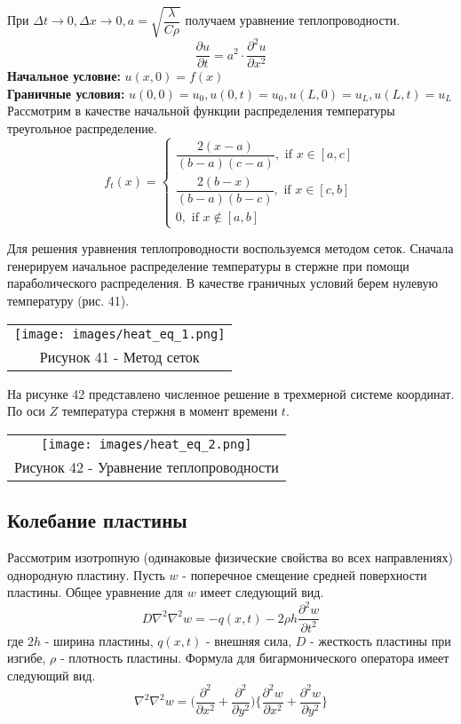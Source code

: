 При $ \Delta t\to 0, \Delta x\to 0,a=\sqrt{\dfrac{\lambda}{C\rho}}$ получаем уравнение теплопроводности.
\begin{equation}
  \dfrac{\partial u}{\partial t}=a^2\cdot\dfrac{\partial^2 u}{\partial x^2}
\end{equation}
\textbf{Начальное условие:} $u(x,0)=f(x)$\\
\textbf{Граничные условия:} $u(0,0)=u_0,u(0,t)=u_0,u(L,0)=u_L,u(L,t)=u_L$
Рассмотрим в качестве начальной функции распределения температуры треугольное распределение.
\begin{equation}
  f_t(x)=\begin{cases}
    \dfrac{2(x-a)}{(b-a)(c-a)}, \text{ if } x\in[a,c]\\
    \dfrac{2(b-x)}{(b-a)(b-c)}, \text{ if } x\in[c,b]\\
    0, \text{ if } x\notin[a,b]
  \end{cases}
\end{equation}

Для решения уравнения теплопроводности воспользуемся методом сеток. Сначала генерируем начальное распределение температуры в стержне при помощи параболического распределения. В качестве граничных условий берем нулевую температуру (рис. 41).
\begin{center}
  \begin{tabular}{c}
  \texttt{[image: images/heat\_eq\_1.png]}\\
  Рисунок 41 - Метод сеток
\end{tabular}
\end{center}

На рисунке 42 представлено численное решение в трехмерной системе координат. По оси $Z$ температура стержня в момент времени $t$.
\begin{center}
  \begin{tabular}{c}
  \texttt{[image: images/heat\_eq\_2.png]}\\
  Рисунок 42 - Уравнение теплопроводности
\end{tabular}
\end{center}
\subsection{Колебание пластины}
Рассмотрим изотропную (одинаковые физические свойства во всех направлениях) однородную пластину. Пусть $w$ - поперечное смещение средней поверхности пластины.
Общее уравнение для $w$ имеет следующий вид.
\begin{equation}
  D\nabla^2\nabla^2w=-q(x,t)-2\rho h \dfrac{\partial^2 w}{\partial t^2}
\end{equation}
где $2h$ - ширина пластины, $q(x,t)$ - внешняя сила, $D$ - жесткость пластины при изгибе, $\rho$ - плотность пластины.
Формула для бигармонического оператора имеет следующий вид.
\begin{equation}
  \nabla^2\nabla^2w=\bigg(\dfrac{\partial^2}{\partial x^2}+\dfrac{\partial^2}{\partial y^2}\bigg)\bigg\{\dfrac{\partial^2 w}{\partial x^2}+\dfrac{\partial^2 w}{\partial y^2}\bigg\}
\end{equation}

